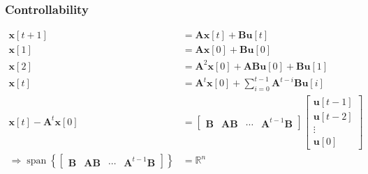 \documentclass[aspectratio=169]{beamer}
\newcommand{\R}{\mathbb{R}}
\begin{document}
\begin{frame}
    \frametitle{Controllability}

    \begin{align}
        \bm{x}[t + 1] &= \bm{Ax}[t] + \bm{Bu}[t] \\
        \bm{x}[1] &= \bm{Ax}[0] + \bm{Bu}[0] \\
        \bm{x}[2] &= \bm{A}^2 \bm{x}[0] + \bm{ABu}[0] + \bm{Bu}[1] \\
        \bm{x}[t] &= \bm{A}^t \bm{x}[0] + \sum_{i = 0}^{t - 1} \bm{A}^{t - i} \bm{Bu}[i] \\
        \bm{x}[t] - \bm{A}^t \bm{x}[0] &=
        \begin{bmatrix}
            \bm{B} & \bm{AB} & \cdots & \bm{A}^{t - 1} \bm{B}
        \end{bmatrix}
        \begin{bmatrix}
            \bm{u}[t - 1] \\
            \bm{u}[t - 2] \\ 
            \vdots \\
            \bm{u}[0]
        \end{bmatrix} \\
        \Rightarrow \operatorname{span}\left\{
        \begin{bmatrix}
            \bm{B} & \bm{AB} & \cdots & \bm{A}^{t - 1} \bm{B}
        \end{bmatrix}\right\} &= \R^n
    \end{align}
\end{frame}
\end{document}
